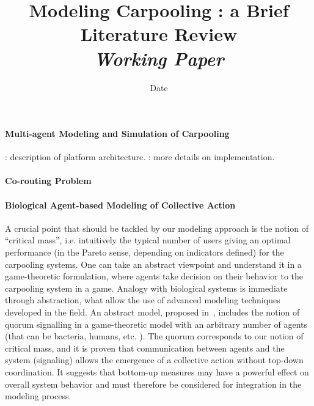 


\title{Modeling Carpooling : a Brief Literature Review\bigskip\\
\textit{Working Paper}
}

\author{}
\date{Date}


\maketitle

\justify


\begin{abstract}

\end{abstract}




\paragraph{Multi-agent Modeling and Simulation of Carpooling}

\textbf{}
\cite{Galland2013860} : description of platform architecture.
\cite{galland2014multi} : more details on implementation.




\paragraph{Co-routing Problem}



\paragraph{Biological Agent-based Modeling of Collective Action}

A crucial point that should be tackled by our modeling approach is the notion of ``critical mass'', i.e. intuitively the typical number of users giving an optimal performance (in the Pareto sense, depending on indicators defined) for the carpooling systems. One can take an abstract viewpoint and understand it in a game-theoretic formulation, where agents take decision on their behavior to the carpooling system in a game. Analogy with biological systems is immediate through abstraction, what allow the use of advanced modeling techniques developed in the field. An abstract model, proposed in~\cite{10.1371/journal.pcbi.1004101}, includes the notion of quorum signalling in a game-theoretic model with an arbitrary number of agents (that can be bacteria, humans, etc. ). The quorum corresponds to our notion of critical mass, and it is proven that communication between agents and the system (signaling) allows the emergence of a collective action without top-down coordination. It suggests that bottom-up measures may have a powerful effect on overall system behavior and must therefore be considered for integration in the modeling process.




